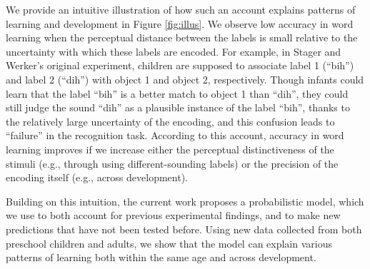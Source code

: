 \documentclass[10pt, letterpaper]{article}
\begin{document}
We provide an intuitive illustration of how such an account explains
patterns of learning and development in Figure \ref{fig:illus}. We
observe low accuracy in word learning when the perceptual distance
between the labels is small relative to the uncertainty with which these
labels are encoded. For example, in Stager and Werker's original
experiment, children are supposed to associate label 1 (``bih'') and
label 2 (``dih'') with object 1 and object 2, respectively. Though
infants could learn that the label ``bih'' is a better match to object 1
than ``dih'', they could still judge the sound ``dih'' as a plausible
instance of the label ``bih'', thanks to the relatively large
uncertainty of the encoding, and this confusion leads to ``failure'' in
the recognition task. According to this account, accuracy in word
learning improves if we increase either the perceptual distinctiveness
of the stimuli (e.g., through using different-sounding labels) or the
precision of the encoding itself (e.g., across development).

Building on this intuition, the current work proposes a probabilistic
model, which we use to both account for previous experimental findings,
and to make new predictions that have not been tested before. Using new
data collected from both preschool children and adults, we show that the
model can explain various patterns of learning both within the same age
and across development.
\end{document}
